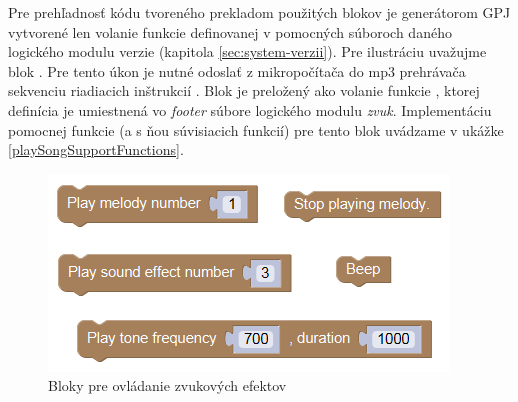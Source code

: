 Pre prehľadnosť kódu tvoreného prekladom použitých blokov je generátorom GPJ vytvorené len volanie funkcie definovanej v pomocných súboroch daného logického modulu verzie (kapitola \ref{sec:system-verzii}). Pre ilustráciu uvažujme blok . Pre tento úkon je nutné odoslať z mikropočítača do mp3 prehrávača sekvenciu riadiacich inštrukcií \cite{DFPlayerMini}. Blok je preložený ako  volanie funkcie , ktorej definícia je umiestnená vo \textit{footer} súbore logického modulu \textit{zvuk}. Implementáciu pomocnej funkcie (a s ňou súvisiacich funkcií) pre tento blok uvádzame v ukážke \ref{playSongSupportFunctions}.

\vspace{2cm}

\begin{figure}[bh!]
\centerline{\includegraphics[]{images/sound-blocks}}
\caption[Bloky pre ovládanie zvukových efektov]{Bloky pre ovládanie zvukových efektov}
\label{obr:sound-blocks}
\end{figure}

\newpage


